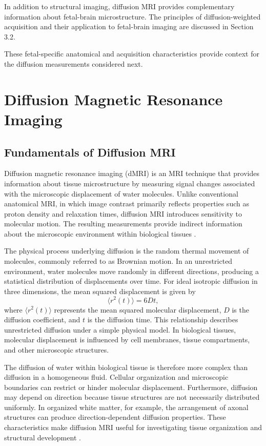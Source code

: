 In addition to structural imaging, diffusion MRI provides complementary information about fetal-brain microstructure. The principles of diffusion-weighted acquisition and their application to fetal-brain imaging are discussed in Section 3.2.

These fetal-specific anatomical and acquisition characteristics provide context for the diffusion measurements considered next.

\section{Diffusion Magnetic Resonance Imaging}
\subsection{Fundamentals of Diffusion MRI}

Diffusion magnetic resonance imaging (dMRI) is an MRI technique that provides information about tissue microstructure by measuring signal changes associated with the microscopic displacement of water molecules. Unlike conventional anatomical MRI, in which image contrast primarily reflects properties such as proton density and relaxation times, diffusion MRI introduces sensitivity to molecular motion. The resulting measurements provide indirect information about the microscopic environment within biological tissues \autocite{lebihan1986ivim,basser1994tensor}.

The physical process underlying diffusion is the random thermal movement of molecules, commonly referred to as Brownian motion. In an unrestricted environment, water molecules move randomly in different directions, producing a statistical distribution of displacements over time. For ideal isotropic diffusion in three dimensions, the mean squared displacement is given by
\begin{equation}
\langle r^2(t)\rangle = 6Dt,
\end{equation}
where $\langle r^2(t)\rangle$ represents the mean squared molecular displacement, $D$ is the diffusion coefficient, and $t$ is the diffusion time. This relationship describes unrestricted diffusion under a simple physical model. In biological tissues, molecular displacement is influenced by cell membranes, tissue compartments, and other microscopic structures.

The diffusion of water within biological tissue is therefore more complex than diffusion in a homogeneous fluid. Cellular organization and microscopic boundaries can restrict or hinder molecular displacement. Furthermore, diffusion may depend on direction because tissue structures are not necessarily distributed uniformly. In organized white matter, for example, the arrangement of axonal structures can produce direction-dependent diffusion properties. These characteristics make diffusion MRI useful for investigating tissue organization and structural development \autocite{basser1994tensor}.

